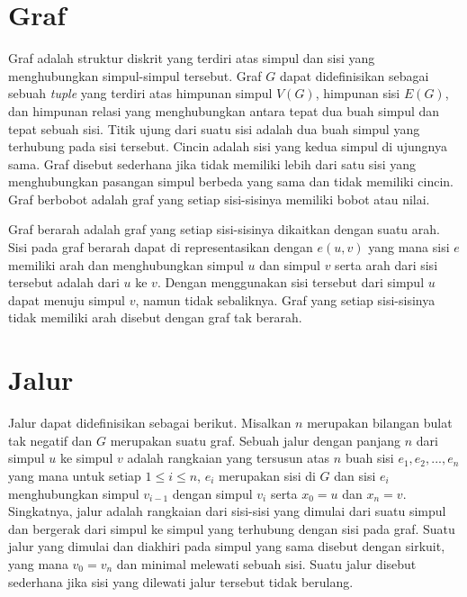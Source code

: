\medskip

\medskip

\medskip


\section{Graf}

Graf adalah struktur diskrit yang terdiri atas simpul dan sisi yang menghubungkan 
simpul-simpul tersebut. Graf $G$ dapat didefinisikan sebagai sebuah \textit{tuple} yang 
terdiri atas himpunan simpul $V(G)$, himpunan sisi $E(G)$, dan himpunan relasi yang 
menghubungkan antara tepat dua buah simpul dan tepat sebuah sisi. Titik ujung dari suatu 
sisi adalah dua buah simpul yang terhubung pada sisi tersebut. Cincin adalah sisi yang 
kedua simpul di ujungnya sama. Graf disebut sederhana jika tidak memiliki lebih dari 
satu sisi yang menghubungkan pasangan simpul berbeda yang sama dan tidak memiliki cincin. 
Graf berbobot adalah graf yang setiap sisi-sisinya memiliki bobot atau nilai.

Graf berarah adalah graf yang setiap sisi-sisinya dikaitkan dengan suatu arah. Sisi pada 
graf berarah dapat di representasikan dengan $e (u, v)$ yang mana sisi $e$ memiliki arah 
dan menghubungkan simpul $u$ dan simpul $v$ serta arah dari sisi tersebut adalah dari $u$ 
ke $v$. Dengan menggunakan sisi tersebut dari simpul $u$ dapat menuju simpul $v$, namun 
tidak sebaliknya. Graf yang setiap sisi-sisinya tidak memiliki arah disebut dengan graf 
tak berarah.

\section{Jalur}

Jalur dapat didefinisikan sebagai berikut. Misalkan $n$ merupakan bilangan bulat tak 
negatif dan $G$ merupakan suatu graf. Sebuah jalur dengan panjang $n$ dari simpul $u$ 
ke simpul $v$ adalah rangkaian yang tersusun atas $n$ buah sisi 
$e_{1}, e_{2}, ..., e_{n}$ yang mana untuk setiap $1 \leq i \leq n$, $e_{i}$ merupakan 
sisi di $G$ dan sisi $e_{i}$ menghubungkan simpul $v_{i-1}$ dengan simpul $v_{i}$ serta 
$x_{0} = u$ dan $x_{n} = v$. Singkatnya, jalur adalah rangkaian dari sisi-sisi yang 
dimulai dari suatu simpul dan bergerak dari simpul ke simpul yang terhubung dengan sisi 
pada graf. Suatu jalur yang dimulai dan diakhiri pada simpul yang sama disebut dengan 
sirkuit, yang mana $v_{0} = v_{n}$ dan minimal melewati sebuah sisi. Suatu jalur disebut 
sederhana jika sisi yang dilewati jalur tersebut tidak berulang.

